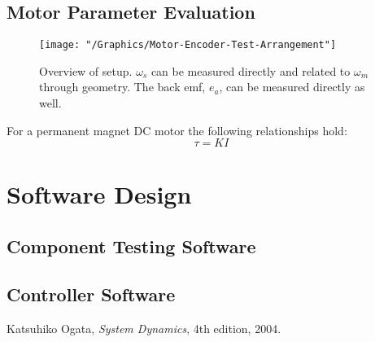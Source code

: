 \documentclass{article}
\begin{document}
	
	\subsection{Motor Parameter Evaluation}
	\begin{figure}[h]
		\centerline{\texttt{[image: "/Graphics/Motor-Encoder-Test-Arrangement"]}}
		\caption{Overview of setup. $\omega_s$ can be measured directly and related to $\omega_m$ through geometry. The back emf, $e_a$, can be measured directly as well.}
		\label{fig:DirectFeedRL}
	\end{figure}
	
	For a permanent magnet DC motor the following relationships hold\cite{Ogata}:
	$$\tau = KI$$
	$$$$
	

\section{Software Design}
	\subsection{Component Testing Software}
	
	\subsection{Controller Software}
	
\begin{thebibliography}{9}	%

		Katsuhiko Ogata,
		\textit{System Dynamics},
		4th edition,
		2004.

\end{thebibliography}
\end{document}
